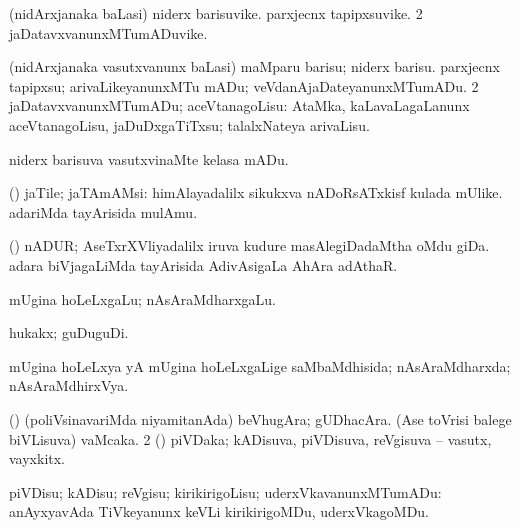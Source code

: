 \bentry
{}
\gl{\nA}
\bmng
\bnum
{} (nidArxjanaka baLasi) 
\banum
{} niderx barisuvike. 
 parxjecnx tapipxsuvike. 
\eanum
\numie
\num{2} jaDatavxvanunxMTumADuvike. 
\enum
\emng
\eentry

\bentry
{}
\gl{\sakirx}
\bmng
\bnum
{} (nidArxjanaka vasutxvanunx baLasi) 
\banum
{} maMparu barisu; niderx barisu. 
 parxjecnx tapipxsu; arivaLikeyanunxMTu mADu; veVdanAjaDateyanunxMTumADu. 
\eanum
\numie
\num{2} jaDatavxvanunxMTumADu; aceVtanagoLisu:  AtaMka, kaLavaLagaLanunx aceVtanagoLisu, jaDuDxgaTiTxsu; talalxNateya arivaLisu. 
\enum
\emng

\noindent
\gl{\akirx}
\bmng
niderx barisuva vasutxvinaMte kelasa mADu. 
\emng
\eentry

\bentry
{}
\gl{\nA}
\bmng
(\savi) jaTile; jaTAmAMsi: 
\banum
{} himAlayadalilx sikukxva nADoRsATxkisf kulada mUlike. 
 adariMda tayArisida mulAmu. 
\eanum
\emng
\eentry

\bentry
{}
\gl{\nA}
\bmng
(\savi) nADUR; 
\banum
{} AseTxrXVliyadalilx iruva kudure masAlegiDadaMtha oMdu giDa. 
 adara biVjagaLiMda tayArisida AdivAsigaLa AhAra adAthaR. 
\eanum
\emng
\eentry

\bentry
{}
\gl{\nA}
\expl{(\bava) (\aMrashA)}
\bmng
mUgina hoLeLxgaLu; nAsAraMdharxgaLu. 
\emng
\eentry

\bentry
{}
\gl{\nA}
\bmng
hukakx; guDuguDi.  
\emng
\eentry

\bentry
{}
\gl{\gu}
\bmng
mUgina hoLeLxya yA mUgina hoLeLxgaLige saMbaMdhisida; nAsAraMdharxda; nAsAraMdhirxVya. 
\emng
\eentry

\bentry
{}
\gl{\nA}
\bmng
\bnum
{} (\birx) (poliVsinavariMda niyamitanAda) 
\banum
{} beVhugAra; gUDhacAra. 
 (Ase toVrisi balege biVLisuva) vaMcaka. 
\eanum
\numie
\num{2} (\AseTxrXV) piVDaka; kADisuva, piVDisuva, reVgisuva -- vasutx, vayxkitx. 
\enum
\emng
\eentry

\bentry
{}
\gl{\sakirx}
\bmng
piVDisu; kADisu; reVgisu; kirikirigoLisu; uderxVkavanunxMTumADu:  anAyxyavAda TiVkeyanunx keVLi kirikirigoMDu, uderxVkagoMDu. 
\emng

